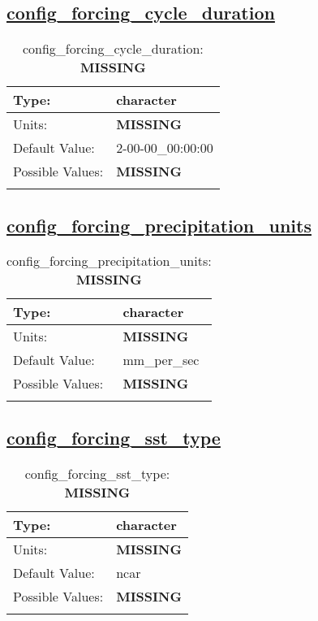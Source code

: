 \subsection[config\_forcing\_cycle\_duration]{\hyperref[sec:nm_tab_forcing]{config\_forcing\_cycle\_duration}}
\label{subsec:nm_sec_config_forcing_cycle_duration}
\begin{center}
\begin{longtable}{| p{2.0in} || p{4.0in} |}
    \hline
    Type: & character \\
    \hline
    Units: & {\bf \color{red} MISSING} \\
    \hline
    Default Value: & 2-00-00\_00:00:00 \\
    \hline
    Possible Values: & {\bf \color{red} MISSING} \\
    \hline
    \caption{config\_forcing\_cycle\_duration: {\bf \color{red} MISSING}}
\end{longtable}
\end{center}
\subsection[config\_forcing\_precipitation\_units]{\hyperref[sec:nm_tab_forcing]{config\_forcing\_precipitation\_units}}
\label{subsec:nm_sec_config_forcing_precipitation_units}
\begin{center}
\begin{longtable}{| p{2.0in} || p{4.0in} |}
    \hline
    Type: & character \\
    \hline
    Units: & {\bf \color{red} MISSING} \\
    \hline
    Default Value: & mm\_per\_sec \\
    \hline
    Possible Values: & {\bf \color{red} MISSING} \\
    \hline
    \caption{config\_forcing\_precipitation\_units: {\bf \color{red} MISSING}}
\end{longtable}
\end{center}
\subsection[config\_forcing\_sst\_type]{\hyperref[sec:nm_tab_forcing]{config\_forcing\_sst\_type}}
\label{subsec:nm_sec_config_forcing_sst_type}
\begin{center}
\begin{longtable}{| p{2.0in} || p{4.0in} |}
    \hline
    Type: & character \\
    \hline
    Units: & {\bf \color{red} MISSING} \\
    \hline
    Default Value: & ncar \\
    \hline
    Possible Values: & {\bf \color{red} MISSING} \\
    \hline
    \caption{config\_forcing\_sst\_type: {\bf \color{red} MISSING}}
\end{longtable}
\end{center}
